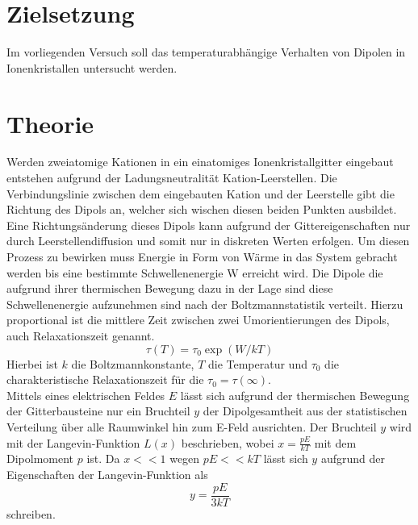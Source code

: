 ﻿\section{Zielsetzung}
Im vorliegenden Versuch soll das temperaturabhängige Verhalten von Dipolen in Ionenkristallen untersucht werden.

\section{Theorie}
Werden zweiatomige Kationen in ein einatomiges Ionenkristallgitter
eingebaut entstehen aufgrund der Ladungsneutralität Kation-Leerstellen.
Die Verbindungslinie zwischen dem eingebauten Kation und der Leerstelle gibt
die Richtung des Dipols an, welcher sich wischen diesen beiden
Punkten ausbildet.
Eine Richtungsänderung dieses Dipols kann aufgrund der Gittereigenschaften
nur durch Leerstellendiffusion und somit nur in diskreten Werten erfolgen.
Um diesen Prozess zu bewirken muss Energie in Form von Wärme in das System gebracht werden bis
eine bestimmte Schwellenenergie W erreicht wird.
Die Dipole die aufgrund ihrer thermischen Bewegung dazu in der Lage sind
diese Schwellenenergie aufzunehmen sind nach der Boltzmannstatistik verteilt.
Hierzu proportional ist die mittlere Zeit zwischen zwei Umorientierungen des Dipols, auch Relaxationszeit genannt.
\begin{equation}
\tau (T)=\tau_{0}\exp(W/kT)
\label{eqn:rel}
\end{equation}
 Hierbei ist $k$ die Boltzmannkonstante, $T$ die Temperatur und $\tau_{0}$ die
 charakteristische Relaxationszeit für die $\tau_{0}=\tau(\infty)$.\\
 Mittels eines elektrischen Feldes $E$ lässt sich aufgrund der thermischen
 Bewegung der Gitterbausteine nur ein Bruchteil $y$ der Dipolgesamtheit aus der statistischen Verteilung
 über alle Raumwinkel hin zum E-Feld ausrichten. Der Bruchteil $y$ wird mit der
 Langevin-Funktion $L(x)$ beschrieben, wobei $x=\frac{pE}{kT}$ mit dem Dipolmoment $p$ ist.
 Da $x<<1$ wegen $pE<<kT$ lässt sich $y$ aufgrund der Eigenschaften der Langevin-Funktion als
 \begin{equation}
 y=\frac{pE}{3kT}
 \end{equation}
 schreiben.
